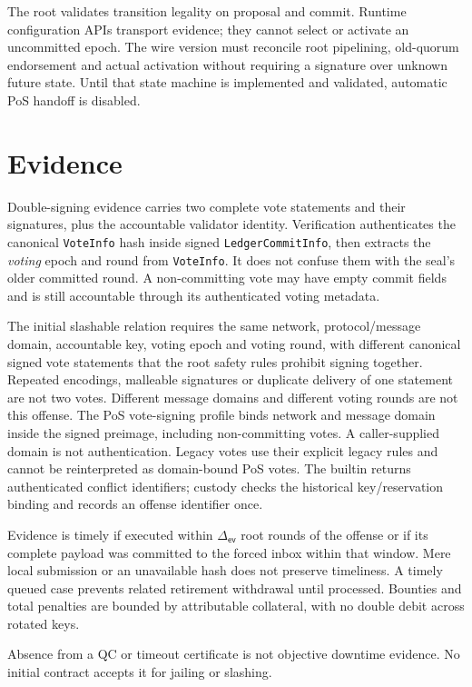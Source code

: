 The root validates transition legality on proposal and commit. Runtime configuration APIs transport evidence; they cannot select or activate an uncommitted epoch. The wire version must reconcile root pipelining, old-quorum endorsement and actual activation without requiring a signature over unknown future state. Until that state machine is implemented and validated, automatic PoS handoff is disabled.

\section{Evidence}\label{app:gov-evidence}

Double-signing evidence carries two complete vote statements and their signatures, plus the accountable validator identity. Verification authenticates the canonical \texttt{VoteInfo} hash inside signed \texttt{LedgerCommitInfo}, then extracts the \emph{voting} epoch and round from \texttt{VoteInfo}. It does not confuse them with the seal's older committed round. A non-committing vote may have empty commit fields and is still accountable through its authenticated voting metadata.

The initial slashable relation requires the same network, protocol/message domain, accountable key, voting epoch and voting round, with different canonical signed vote statements that the root safety rules prohibit signing together. Repeated encodings, malleable signatures or duplicate delivery of one statement are not two votes. Different message domains and different voting rounds are not this offense. The PoS vote-signing profile binds network and message domain inside the signed preimage, including non-committing votes. A caller-supplied domain is not authentication. Legacy votes use their explicit legacy rules and cannot be reinterpreted as domain-bound PoS votes. The builtin returns authenticated conflict identifiers; custody checks the historical key/reservation binding and records an offense identifier once.

Evidence is timely if executed within $\Delta_\mathsf{ev}$ root rounds of the offense or if its complete payload was committed to the forced inbox within that window. Mere local submission or an unavailable hash does not preserve timeliness. A timely queued case prevents related retirement withdrawal until processed. Bounties and total penalties are bounded by attributable collateral, with no double debit across rotated keys.

Absence from a QC or timeout certificate is not objective downtime evidence. No initial contract accepts it for jailing or slashing.

